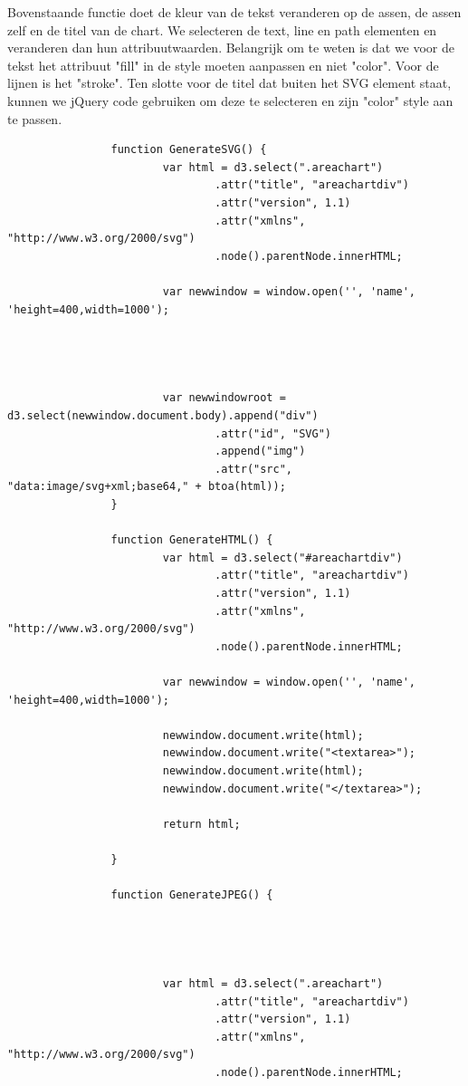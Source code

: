 Bovenstaande functie doet de kleur van de tekst veranderen op de assen, de assen zelf en de titel van de chart. We selecteren de text, line en path elementen en veranderen dan hun attribuutwaarden. Belangrijk om te weten is dat we voor de tekst het attribuut "fill" in de style moeten aanpassen en niet "color". Voor de lijnen is het "stroke". Ten slotte voor de titel dat buiten het SVG element staat, kunnen we jQuery code gebruiken om deze te selecteren en zijn "color" style aan te passen.

\begin{lstlisting}
                function GenerateSVG() {
                        var html = d3.select(".areachart")
                                .attr("title", "areachartdiv")
                                .attr("version", 1.1)
                                .attr("xmlns", "http://www.w3.org/2000/svg")
                                .node().parentNode.innerHTML;

                        var newwindow = window.open('', 'name', 'height=400,width=1000');




                        var newwindowroot = d3.select(newwindow.document.body).append("div")
                                .attr("id", "SVG")
                                .append("img")
                                .attr("src", "data:image/svg+xml;base64," + btoa(html));
                }

                function GenerateHTML() {
                        var html = d3.select("#areachartdiv")
                                .attr("title", "areachartdiv")
                                .attr("version", 1.1)
                                .attr("xmlns", "http://www.w3.org/2000/svg")
                                .node().parentNode.innerHTML;

                        var newwindow = window.open('', 'name', 'height=400,width=1000');

                        newwindow.document.write(html);
                        newwindow.document.write("<textarea>");
                        newwindow.document.write(html);
                        newwindow.document.write("</textarea>");

                        return html;

                }

                function GenerateJPEG() {




                        var html = d3.select(".areachart")
                                .attr("title", "areachartdiv")
                                .attr("version", 1.1)
                                .attr("xmlns", "http://www.w3.org/2000/svg")
                                .node().parentNode.innerHTML;


\end{lstlisting}
